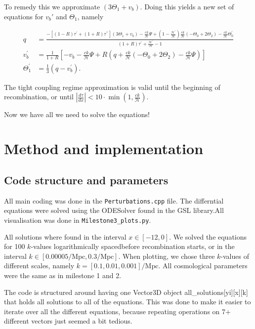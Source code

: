 \documentclass[12pt]{article}
\begin{document}
To remedy this we approximate $(3\Theta_1 + v_b)$. Doing this yields a new set of equations for $v_b'$ and $\Theta_1$, namely 

\begin{equation}\begin{aligned}\label{eq: tight coupling regime dx}
    q &=\frac{-\left[(1-R) \tau^{\prime}+(1+R) \tau^{\prime \prime}\right]\left(3 \Theta_{1}+v_{b}\right)-\frac{c k}{\mathcal{H}} \Psi+\left(1-\frac{\mathcal{H}^{\prime}}{\mathcal{H}}\right) \frac{c k}{\mathcal{H}}\left(-\Theta_{0}+2 \Theta_{2}\right)-\frac{c k}{\mathcal{H}} \Theta_{0}^{\prime}}{(1+R) \tau^{\prime}+\frac{\mathcal{H}^{\prime}}{\mathcal{H}}-1} \\
    v_{b}^{\prime} &=\frac{1}{1+R}\left[-v_{b}-\frac{c k}{\mathcal{H}} \Psi+R\left(q+\frac{c k}{\mathcal{H}}\left(-\Theta_{0}+2 \Theta_{2}\right)-\frac{c k}{\mathcal{H}} \Psi\right)\right] \\
    \Theta_{1}^{\prime} &=\frac{1}{3}\left(q-v_{b}^{\prime}\right).
\end{aligned}\end{equation}

The tight coupling regime approximation is valid until the beginning of recombination, or until $\left|\frac{d \tau}{d x}\right|<10 \cdot \min \left(1, \frac{c k}{\mathcal{H}}\right)$.

Now we have all we need to solve the equations!

\section{Method and implementation}
\subsection{Code structure and parameters}
All main coding was done in the \texttt{Perturbations.cpp} file. The differntial equations were solved using the ODESolver found in the GSL library.All visualisation was done in \texttt{Milestone3\_plots.py}. 

All solutions where found in the interval $x\in[-12,0]$. We solved the equations for 100 $k$-values logarithmically spacedbefore recombination starts, or  in the interval $k\in[0.00005/\mathrm{Mpc}, 0.3/\mathrm{Mpc}]$. When plotting, we chose three $k$-values of different scales, namely $k=[0.1,0.01,0.001]/\mathrm{Mpc}$. All cosmological parameters were the same as in milestone 1 and 2. 

The code is structured around having one Vector3D object all\_solutions[yi][x][k] that holds all solutions to all of the equations. This was done to make it easier to iterate over all the different equations, because repeating operations on 7+ different vectors just seemed a bit tedious.
\end{document}
